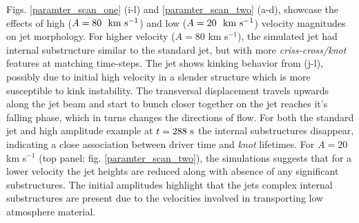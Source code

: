 \documentclass[12pt]{ociamthesis}
\newcommand{\fref}[1]{fig. \ref{#1}}
\newcommand{\kms}{~\rm{km ~s^{-1}}}
\newcommand{\np}{\\ \\}
\begin{document}
%
Figs. \ref{paramter_scan_one} (i-l) and \ref{paramter_scan_two} (a-d), showcase the effects of high ($A = 80 ~\kms$) and low ($A = 20 ~\kms$) velocity magnitudes on jet morphology. For higher velocity ($A = 80$ km s$^{-1}$), the simulated jet had internal substructure similar to the standard jet, but with more \textit{criss-cross/knot} features at matching time-steps. The jet shows kinking behavior from (j-l), possibly due to initial high velocity in a slender structure which is more susceptible to kink instability. The transversal displacement travels upwards along the jet beam and start to bunch closer together on the jet reaches it's falling phase, which in turns changes the directions of flow. For both the standard jet and high amplitude example at $t = 288 ~\rm{s}$ the internal substructures disappear, indicating a close association between driver time and \textit{knot} lifetimes. For $A = 20$ km s$^{-1}$ (top panel: \fref{paramter_scan_two}), the simulations suggests that for a lower velocity the jet heights are reduced along with absence of any significant substructures. The initial amplitudes highlight that the jets complex internal substructures are present due to the velocities involved in transporting low atmosphere material. \np
\end{document}
